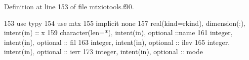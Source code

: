 Definition at line 153 of file mtxiotools.\+f90.


\begin{DoxyCode}
153         \textcolor{keywordtype}{use }typy
154         \textcolor{keywordtype}{use }mtx
155         \textcolor{keywordtype}{implicit none}
157         \textcolor{keywordtype}{real(kind=rkind)}, \textcolor{keywordtype}{dimension(:)}, \textcolor{keywordtype}{intent(in)} :: x
159         \textcolor{keywordtype}{character(len=*)}, \textcolor{keywordtype}{intent(in)}, \textcolor{keywordtype}{optional} ::name
161         \textcolor{keywordtype}{integer}, \textcolor{keywordtype}{intent(in)}, \textcolor{keywordtype}{optional} :: fil
163         \textcolor{keywordtype}{integer}, \textcolor{keywordtype}{intent(in)}, \textcolor{keywordtype}{optional} :: ilev
165         \textcolor{keywordtype}{integer}, \textcolor{keywordtype}{intent(in)}, \textcolor{keywordtype}{optional} :: ierr
173         \textcolor{keywordtype}{integer}, \textcolor{keywordtype}{intent(in)}, \textcolor{keywordtype}{optional} :: mode
\end{DoxyCode}
